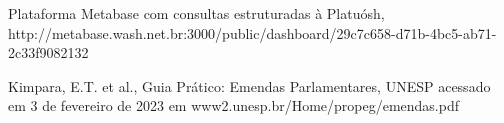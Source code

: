 \documentclass[
12pt,		%
openright,	%
twoside,  %
a4paper,			%
chapter=TITLE,		%
english,			%
french,				%
spanish,			%
brazil				%
]{USPSC-classe/USPSC}
\begin{document}
\begin{flushleft}
\begin{flushleft}
\begin{flushleft}
\begin{flushleft}
\begin{flushleft}
\begin{flushleft}
\begin{flushleft}
\begin{flushleft}
[WASH, 2023] Plataforma Metabase com consultas estruturadas \`a Platu\'osh, http://metabase.wash.net.br:3000/public/dashboard/29c7c658-d71b-4bc5-ab71-2c33f9082132
\end{flushleft}


\end{flushleft}


\end{flushleft}


\end{flushleft}


\end{flushleft}


\end{flushleft}


\end{flushleft}


\end{flushleft}


\begin{flushleft}
\begin{flushleft}
\begin{flushleft}
\begin{flushleft}
\begin{flushleft}
\begin{flushleft}
\begin{flushleft}
\begin{flushleft}
[KIMPARA et al., 2023] Kimpara, E.T. et al., Guia Pr\'atico: Emendas Parlamentares, UNESP acessado em 3 de fevereiro de 2023 em www2.unesp.br/Home/propeg/emendas.pdf
\end{flushleft}


\end{flushleft}


\end{flushleft}


\end{flushleft}


\end{flushleft}


\end{flushleft}


\end{flushleft}


\end{flushleft}
\end{document}
